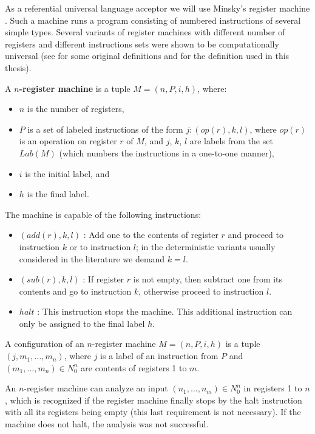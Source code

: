 As a referential universal language acceptor we will use  Minsky's register machine \cite{Ionescu:jucs_10_5:on_p_systems_with}. Such a machine runs a program consisting of numbered instructions of several simple types. Several variants of register machines with different number of registers and different instructions sets were shown to be computationally universal (see \cite{Ibarra05Active} for some original definitions and \cite{Khrisna03threeuniversality} for the definition used in this thesis).
\begin{definition}
  A {\bf $n$-register machine} is a tuple $M = (n,P,i,h)$, where:
  \begin{itemize}
    \item $n$ is the number of registers,
    \item $P$ is a set of labeled instructions of the form $j : (op(r),k,l)$, where $op(r)$ is an operation on register $r$ of $M$, and $j$, $k$, $l$ are labels from the set $Lab(M)$ (which numbers the instructions in a one-to-one manner),
    \item $i$ is the initial label, and
    \item $h$ is the final label.
  \end{itemize}
\end{definition}

The machine is capable of the following instructions:
\begin{itemize}
  \item $(add(r),k,l)$ : Add one to the contents of register $r$ and proceed to instruction $k$ or to instruction $l$; in the deterministic variants usually considered in the literature we demand $k = l$.
  \item $(sub(r),k,l)$ : If register $r$ is not empty, then subtract one from its contents and go to instruction $k$, otherwise proceed to instruction $l$.
  \item $halt$ : This instruction stops the machine. This additional instruction can only be assigned to the final label $h$.
\end{itemize}

\begin{definition}
  A configuration of an $n$-register machine $M = (n,P,i,h)$ is a tuple $(j, m_1, \dots , m_n)$, where $j$ is a label of an instruction from $P$ and $(m_1,\dots,m_n)\in N_0^n$ are contents of registers 1 to $m$.
\end{definition}

An $n$-register machine can analyze an input $(n_1,\dots,n_m)\in N_0^n$ in registers 1 to $n$, which is recognized if the register machine finally stops by the halt instruction with all its registers being empty (this last requirement is not necessary). If the machine does not halt, the analysis was not successful.